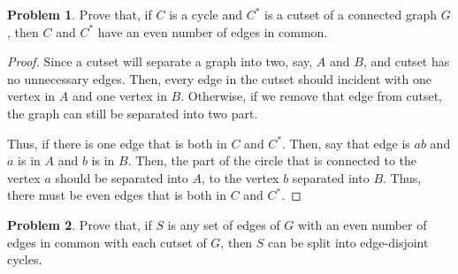 \documentclass[a4paper,11pt]{article}%
\theoremstyle{remark}
\theoremstyle{definition}
\newtheorem{problem}{Problem}[subsection]
\begin{document}
\begin{problem}
    Prove that, if $C$ is a cycle and $C^*$ is 
    a cutset of a connected graph $G$, then $C$ and $C^*$ have an even number 
    of edges in common.
    \begin{proof}
        Since a cutset will separate a graph into two, say, $A$ and $B$,
        and cutset has no unnecessary edges. Then, every edge in the cutset 
        should incident with one vertex in $A$ and one vertex in $B$.
        Otherwise, if we remove that edge from cutset, the graph can still be
        separated into two part.

        Thus, if there is one edge that is both in $C$ and $C^*$. Then, 
        say that edge is $ab$ and $a$ is in $A$ and $b$ is in $B$.
        Then, the part of the circle that is connected to the vertex $a$ should 
        be separated into $A$, to the vertex $b$ separated into $B$.
        Thus, there must be even edges that is both in $C$ and $C^*$.
    \end{proof}
\end{problem}
\begin{problem}
    Prove that, if $S$ is any set of edges of $G$ with an even number 
    of edges in common with each cutset of $G$, then $S$ can be split into 
    edge-disjoint cycles.
\end{problem}
\end{document}
